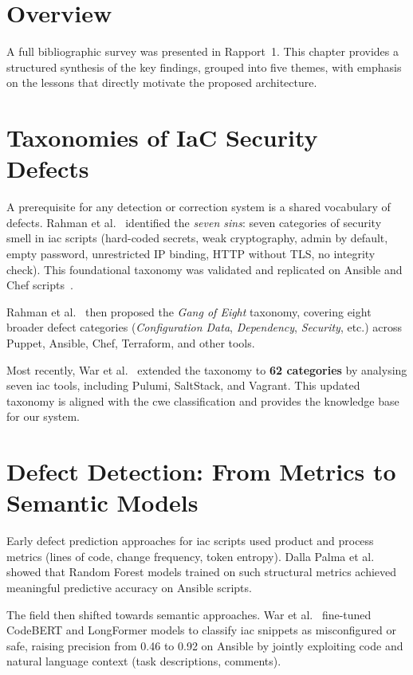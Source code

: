 \documentclass[12pt, a4paper]{report}
\begin{document}
\section{Overview}

A full bibliographic survey was presented in Rapport~1. This chapter provides a
structured synthesis of the key findings, grouped into five themes, with emphasis on the
lessons that directly motivate the proposed architecture.

\section{Taxonomies of IaC Security Defects}

A prerequisite for any detection or correction system is a shared vocabulary of defects.
Rahman et al.~\citep{rahman2019seven} identified the \emph{seven sins}: seven categories
of security smell in \gls{iac} scripts (hard-coded secrets, weak cryptography, admin by
default, empty password, unrestricted IP binding, HTTP without TLS, no integrity check).
This foundational taxonomy was validated and replicated on Ansible and Chef
scripts~\citep{rahman2021security}.

Rahman et al.~\citep{rahman2020gang} then proposed the \emph{Gang of Eight} taxonomy,
covering eight broader defect categories (\emph{Configuration Data}, \emph{Dependency},
\emph{Security}, etc.) across Puppet, Ansible, Chef, Terraform, and other tools.

Most recently, War et al.~\citep{war2025taxonomy} extended the taxonomy to \textbf{62
categories} by analysing seven \gls{iac} tools, including Pulumi, SaltStack, and Vagrant.
This updated taxonomy is aligned with the \gls{cwe} classification and provides the
knowledge base for our system.

\section{Defect Detection: From Metrics to Semantic Models}

Early defect prediction approaches for \gls{iac} scripts used product and process
metrics (lines of code, change frequency, token entropy). Dalla Palma et
al.~\citep{dallapalma2022defect} showed that Random Forest models trained on such
structural metrics achieved meaningful predictive accuracy on Ansible scripts.

The field then shifted towards semantic approaches. War et al.~\citep{war2025detection}
fine-tuned CodeBERT and LongFormer models to classify \gls{iac} snippets as
misconfigured or safe, raising precision from 0.46 to 0.92 on Ansible by jointly
exploiting code and natural language context (task descriptions, comments).
\end{document}
